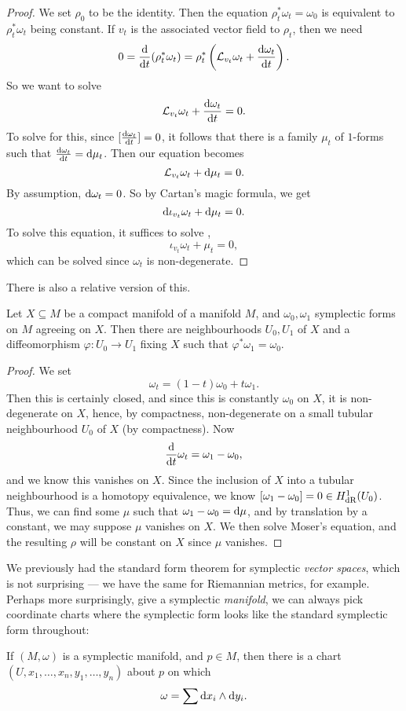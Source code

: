 \documentclass[a4paper]{article}
\begin{document}
\begin{proof}
  We set $\rho_0$ to be the identity. Then the equation $\rho_t^* \omega_t = \omega_0$ is equivalent to $\rho_t^* \omega_t$ being constant. If $v_t$ is the associated vector field to $\rho_t$, then we need
  \[
    0 = \frac{\mathrm{d}}{\mathrm{d} t}(\rho_t^* \omega_t) = \rho_t^* \left(\mathcal{L}_{v_t} \omega_t + \frac{\mathrm{d} \omega_t}{\mathrm{d} t}\right).
  \]
  So we want to solve
  \[
    \mathcal{L}_{v_t} \omega_t + \frac{\mathrm{d} \omega_t}{\mathrm{d} t} = 0.
  \]
  To solve for this, since $[\frac{\mathrm{d} \omega_t}{\mathrm{d} t}] = 0$, it follows that there is a family $\mu_t$ of $1$-forms such that $\frac{\mathrm{d} \omega_t}{\mathrm{d} t} = \mathrm{d} \mu_t$. Then our equation becomes
  \[
    \mathcal{L}_{v_t} \omega_t + \mathrm{d} \mu_t = 0.
  \]
  By assumption, $\mathrm{d} \omega_t = 0$. So by Cartan's magic formula, we get
  \[
    \mathrm{d} \iota_{v_t} \omega_t + \mathrm{d} \mu_t = 0.
  \]
  To solve this equation, it suffices to solve ,
  \[
    \iota_{v_t} \omega_t + \mu_t = 0,
  \]
  which can be solved since $\omega_t$ is non-degenerate.
\end{proof}

There is also a relative version of this.
\begin{thm}
  Let $X \subseteq M$ be a compact manifold of a manifold $M$, and $\omega_0, \omega_1$ symplectic forms on $M$ agreeing on $X$. Then there are neighbourhoods $U_0, U_1$ of $X$ and a diffeomorphism $\varphi: U_0 \to U_1$ fixing $X$ such that $\varphi^* \omega_1 = \omega_0$.
\end{thm}

\begin{proof}
  We set
  \[
    \omega_t = (1 - t) \omega_0 + t \omega_1.
  \]
  Then this is certainly closed, and since this is constantly $\omega_0$ on $X$, it is non-degenerate on $X$, hence, by compactness, non-degenerate on a small tubular neighbourhood $U_0$ of $X$ (by compactness). Now
  \[
    \frac{\mathrm{d}}{\mathrm{d} t} \omega_t = \omega_1 - \omega_0,
  \]
  and we know this vanishes on $X$. Since the inclusion of $X$ into a tubular neighbourhood is a homotopy equivalence, we know $[\omega_1 - \omega_0] = 0 \in H^1_{\mathrm{dR}}(U_0)$. Thus, we can find some $\mu$ such that $\omega_1 - \omega_0 = \mathrm{d} \mu$, and by translation by a constant, we may suppose $\mu$ vanishes on $X$. We then solve Moser's equation, and the resulting $\rho$ will be constant on $X$ since $\mu$ vanishes.
\end{proof}

We previously had the standard form theorem for symplectic \emph{vector spaces}, which is not surprising --- we have the same for Riemannian metrics, for example. Perhaps more surprisingly, give a symplectic \emph{manifold}, we can always pick coordinate charts where the symplectic form looks like the standard symplectic form throughout:
\begin{thm}
  If $(M, \omega)$ is a symplectic manifold, and $p \in M$, then there is a chart $(U, x_1, \ldots, x_n, y_1, \ldots, y_n)$ about $p$ on which
  \[
    \omega = \sum \mathrm{d} x_i \wedge \mathrm{d} y_i.
  \]
\end{thm}
\end{document}
